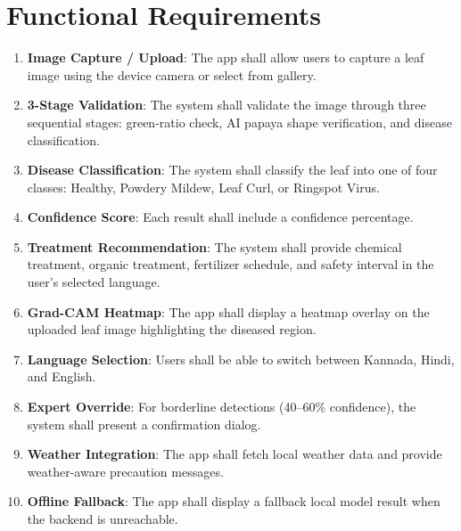 \documentclass[12pt,a4paper]{report}
\begin{document}
\section{Functional Requirements}
\begin{enumerate}
    \item \textbf{Image Capture / Upload}: The app shall allow users to capture a leaf image using the device camera or select from gallery.
    \item \textbf{3-Stage Validation}: The system shall validate the image through three sequential stages: green-ratio check, AI papaya shape verification, and disease classification.
    \item \textbf{Disease Classification}: The system shall classify the leaf into one of four classes: Healthy, Powdery Mildew, Leaf Curl, or Ringspot Virus.
    \item \textbf{Confidence Score}: Each result shall include a confidence percentage.
    \item \textbf{Treatment Recommendation}: The system shall provide chemical treatment, organic treatment, fertilizer schedule, and safety interval in the user's selected language.
    \item \textbf{Grad-CAM Heatmap}: The app shall display a heatmap overlay on the uploaded leaf image highlighting the diseased region.
    \item \textbf{Language Selection}: Users shall be able to switch between Kannada, Hindi, and English.
    \item \textbf{Expert Override}: For borderline detections (40--60\% confidence), the system shall present a confirmation dialog.
    \item \textbf{Weather Integration}: The app shall fetch local weather data and provide weather-aware precaution messages.
    \item \textbf{Offline Fallback}: The app shall display a fallback local model result when the backend is unreachable.
\end{enumerate}
\end{document}
